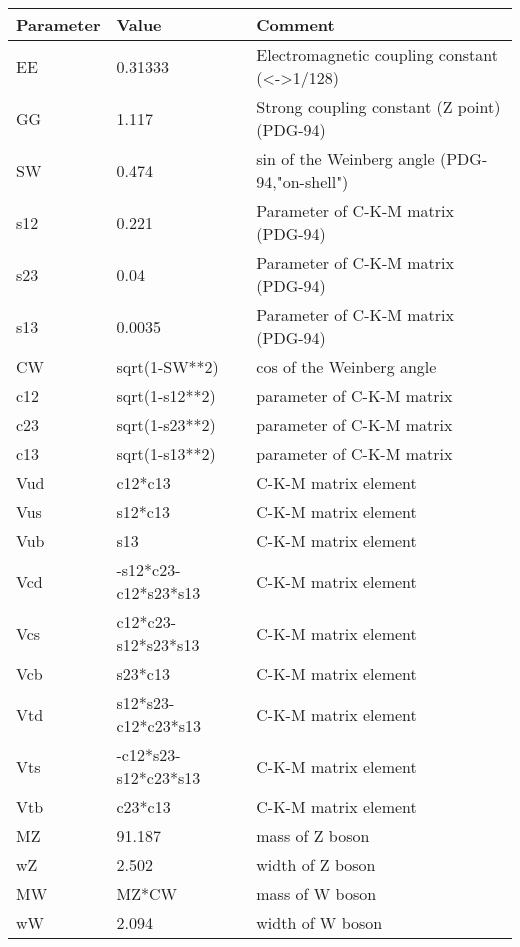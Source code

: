 \textwidth 17cm
\textheight 25cm
\hoffset -3cm
\voffset -1cm
\pagestyle{empty}

\begin{center}

\begin{tabular}{|l|l|l|} \hline
Parameter & Value & Comment \\ \hline
EE    &0.31333             &Electromagnetic coupling constant (<->1/128) \\
GG    &1.117               &Strong coupling constant (Z point)  (PDG-94) \\
SW    &0.474               &sin of the Weinberg angle (PDG-94,"on-shell") \\
s12   &0.221               &Parameter of C-K-M matrix (PDG-94) \\
s23   &0.04                &Parameter of C-K-M matrix (PDG-94) \\
s13   &0.0035              &Parameter of C-K-M matrix (PDG-94) \\
CW    &sqrt(1-SW**2)       &cos of the Weinberg angle \\
c12   &sqrt(1-s12**2)      &parameter  of C-K-M matrix \\
c23   &sqrt(1-s23**2)      &parameter  of C-K-M matrix \\
c13   &sqrt(1-s13**2)      &parameter  of C-K-M matrix \\
Vud   &c12*c13             &C-K-M matrix element \\
Vus   &s12*c13             &C-K-M matrix element \\
Vub   &s13                 &C-K-M matrix element \\
Vcd   &-s12*c23-c12*s23*s13&C-K-M matrix element \\
Vcs   &c12*c23-s12*s23*s13 &C-K-M matrix element \\
Vcb   &s23*c13             &C-K-M matrix element \\
Vtd   &s12*s23-c12*c23*s13 &C-K-M matrix element \\
Vts   &-c12*s23-s12*c23*s13&C-K-M matrix element \\
Vtb   &c23*c13             &C-K-M matrix element \\
MZ    &91.187              &mass of Z boson \\
wZ    &2.502               &width of Z boson \\
MW    &MZ*CW               &mass of W boson \\
wW    &2.094               &width of W boson \\

\end{tabular}
\end{center}
